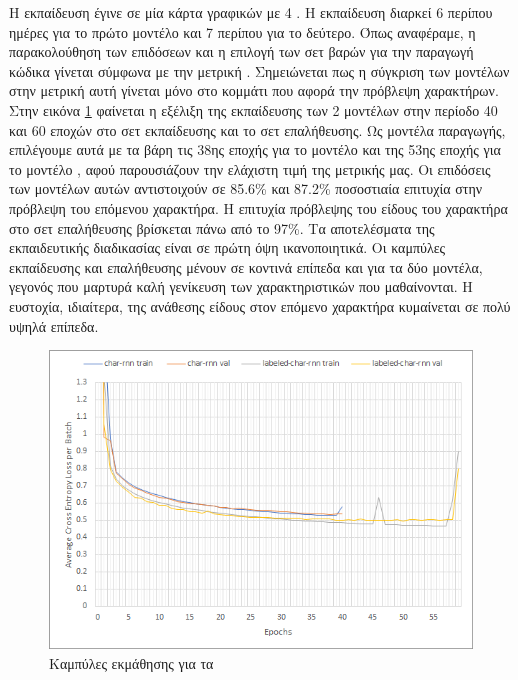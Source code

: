 Η εκπαίδευση έγινε σε μία κάρτα γραφικών  με 4 .
Η εκπαίδευση διαρκεί 6 περίπου ημέρες για το πρώτο μοντέλο και 7 περίπου για το δεύτερο.
Όπως αναφέραμε, η παρακολούθηση των επιδόσεων και η επιλογή των σετ βαρών για την παραγωγή κώδικα γίνεται σύμφωνα με την μετρική .
Σημειώνεται πως η σύγκριση των μοντέλων στην μετρική αυτή γίνεται μόνο στο κομμάτι που αφορά την πρόβλεψη χαρακτήρων.
Στην εικόνα \ref{training1} φαίνεται η εξέλιξη της εκπαίδευσης των 2 μοντέλων στην περίοδο 40 και 60 εποχών στο σετ εκπαίδευσης και το σετ επαλήθευσης. 
Ως μοντέλα παραγωγής, επιλέγουμε αυτά με τα βάρη τις 38ης εποχής για το μοντέλο  και της 53ης εποχής για το μοντέλο , αφού παρουσιάζουν την ελάχιστη τιμή της μετρικής μας.
Οι επιδόσεις των μοντέλων αυτών αντιστοιχούν σε 85.6\% και 87.2\% ποσοστιαία επιτυχία στην πρόβλεψη του επόμενου χαρακτήρα.
Η επιτυχία πρόβλεψης του είδους του χαρακτήρα στο σετ επαλήθευσης βρίσκεται πάνω από το 97\%.
Τα αποτελέσματα της εκπαιδευτικής διαδικασίας είναι σε πρώτη όψη ικανοποιητικά. Οι καμπύλες εκπαίδευσης και επαλήθευσης μένουν σε κοντινά επίπεδα και για τα δύο μοντέλα, γεγονός που μαρτυρά καλή γενίκευση των χαρακτηριστικών που μαθαίνονται. Η ευστοχία, ιδιαίτερα, της ανάθεσης είδους στον επόμενο χαρακτήρα κυμαίνεται σε πολύ υψηλά επίπεδα. 

\begin{figure}[h]
	\includegraphics[trim = 2 2 2 2, clip, keepaspectratio]{images/training1.png}
	\centering
	\caption{Καμπύλες εκμάθησης για τα }
	\label{training1}
\end{figure}


